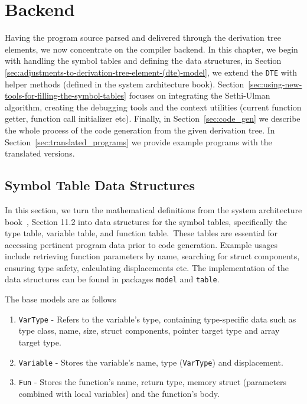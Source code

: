 \chapter{Backend}\label{ch:backend}
Having the program source parsed and delivered through the derivation tree elements, we now
concentrate on the compiler backend.
In this chapter, we begin with handling the symbol tables and defining the data structures, in Section
\ref{sec:adjustments-to-derivation-tree-element-(dte)-model}, we extend the \verb+DTE+
with helper methods (defined in the system architecture book).
Section~\ref{sec:using-new-tools-for-filling-the-symbol-tables} focuses on integrating the Sethi-Ulman algorithm,
creating the debugging tools and the context utilities (current function getter, function call initializer etc).
Finally, in Section~\ref{sec:code_gen} we describe the whole process of the code generation from the given derivation tree.
In Section~\ref{sec:translated_programs} we provide example programs with the translated versions.


\section{Symbol Table Data Structures}\label{sec:symbol_table_models}
In this section, we turn the mathematical definitions from the system architecture book~\cite{sysbook}, Section 11.2 into data structures for the symbol tables, specifically the type table, variable table, and function table.\
These tables are essential for accessing pertinent program data prior to code generation.
Example usages include retrieving function parameters by name, searching for struct components, ensuring type safety, calculating displacements etc.
The implementation of the data structures can be found in packages \verb+model+ and \verb+table+.

The base models are as follows
\begin{enumerate}
    \item \verb+VarType+ - Refers to the variable's type, containing type-specific data such as type class, name,
    size, struct components, pointer target type and array target type.
    \item \verb+Variable+ - Stores the variable's name, type (\verb+VarType+) and displacement.
    \item \verb+Fun+ - Stores the function's name, return type, memory struct (parameters combined with local variables) and the function's body.
\end{enumerate}

